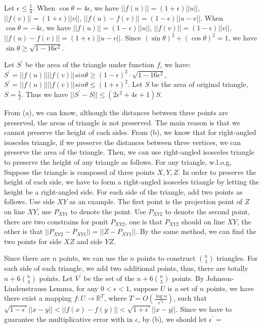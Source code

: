 Let $\epsilon \le \frac{1}{4}$.
When  $\cos\theta=4\epsilon$, we have $||f(u)||=(1+\epsilon) ||u||$, $||f(v)||=(1+\epsilon) ||v||$, $||f(u)-f(v)||=(1-\epsilon) ||u-v||$.
When  $\cos\theta=-4\epsilon$, we have $||f(u)||=(1-\epsilon )||u||$, $||f(v)||=(1-\epsilon) ||v||$, $||f(u)-f(v)||=(1+\epsilon) ||u-v||$.
Since $(\sin\theta)^2+(\cos\theta)^2=1$, we have $\sin\theta \ge \sqrt{1-16\epsilon^2}$.

Let $S^{\prime}$ be the area of the triangle under function $f$, we have:
$S^{\prime}=||f(u)||||f(v)||sin\theta \ge (1-\epsilon)^2 \cdot \sqrt{1-16\epsilon^2}$, 
$S^{\prime}=||f(u)||||f(v)||sin\theta \le (1+\epsilon)^2$.
Let $S$ be the area of original triangle, $S=\frac{1}{2}$.
Thus we have $||S^{\prime}-S||\le (2\epsilon^2+4\epsilon+1)S$.


From (a), we can know, although the distances between three points are preserved, the areas of triangle is not preserved.
The main reason is that we cannot preserve the height of each sides.
From (b), we know that for right-angled isosceles triangle, if we preserve the distances between three vertices, we can preserve the area of the triangle.
Then, we can use right-angled isosceles triangle to preserve the height of any triangle as follows.
For any triangle, w.l.o.g, Suppose the triangle is composed of three points $X,Y,Z$.
In order to preserve the height of each side, we have to form a right-angled isosceles triangle by letting the height be a right-angled side.
For each side of the triangle, add two points as follows.
Use side $XY$ as an example.
The first point is the projection point of $Z$ on line $XY$, use $P_{XY1}$ to denote the point.
Use $P_{XY2}$ to denote the second point, there are two constrains for ponit $P_{XY2}$,
one is that $P_{XY2}$ should on  line $XY$, the other is that $||P_{XY2}-P_{XY1}||=||Z-P_{XY1}||$.
By the same method, we can find the two points for side $XZ$ and side $YZ$.

Since there are $n$ points, we can use the $n$ points to construct $\binom{n}{3}$ triangles.
For each side of each triangle, we add two additional points, thus, there are totally $n+6\binom{n}{3}$ points.
Let $V^{\prime}$ be the set of the $n+6\binom{n}{3}$ points.
By Johnson-Lindenstrauss Lemma, for any $0<\epsilon<1$, suppose $U$ is a set of $n$ points, 
we have there exist a mapping $f: U\rightarrow \mathbb{R}^T$, where $T=O(\frac{\log n}{\epsilon^{\prime 2}})$, 
such that $\sqrt{1-\epsilon^{\prime}}||x-y||<||f(x)-f(y)||<\sqrt{1+\epsilon^{\prime}}||x-y||$.
Since we have to guarantee the multiplicative error with in $\epsilon$, by (b), we should let $\epsilon^{\prime}=$
